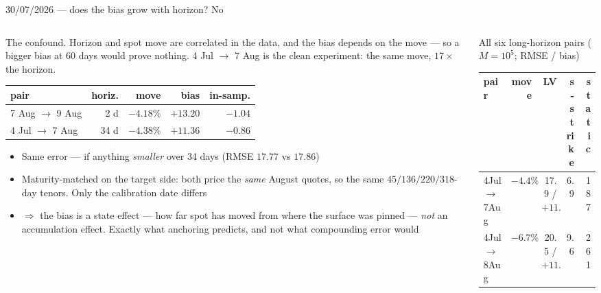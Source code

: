 \documentclass[aspectratio=169,11pt]{beamer}
\newcommand{\gold}[1]{{\color{ntugold}#1}}
\newcommand{\red}[1]{{\color{ntured}#1}}
\begin{document}
\begin{frame}[shrink=8]{30/07/2026 --- does the bias grow with horizon?  No}
  \begin{columns}[T]
    \begin{column}{0.50\linewidth}
      \gold{The confound.} Horizon and spot move are correlated in the data, and the bias
      depends on the move --- so a bigger bias at 60 days would prove nothing.
      \red{4 Jul $\to$ 7 Aug is the clean experiment}: the same move, $17\times$ the horizon.
      \begin{center}\scriptsize
      \begin{tabular}{lrrrr}
        \toprule
        pair & horiz. & move & bias & in-samp. \\
        \midrule
        7 Aug $\to$ 9 Aug & \red{2 d} & $-4.18\%$ & \red{$+13.20$} & $-1.04$ \\
        4 Jul $\to$ 7 Aug & \red{34 d} & $-4.38\%$ & \red{$+11.36$} & $-0.86$ \\
        \bottomrule
      \end{tabular}
      \end{center}
      \begin{itemize}\scriptsize
        \item \red{Same error} --- if anything \emph{smaller} over 34 days
              (RMSE $17.77$ vs $17.86$)
        \item Maturity-matched on the target side: both price the \emph{same} August
              quotes, so the same $45/136/220/318$-day tenors. Only the calibration date
              differs
        \item $\Rightarrow$ the bias is a \gold{state} effect --- how far spot has moved
              from where the surface was pinned --- \emph{not} an accumulation effect.
              Exactly what anchoring predicts, and not what compounding error would
      \end{itemize}
    \end{column}
    \begin{column}{0.46\linewidth}
      \gold{All six long-horizon pairs} ($M=10^5$; RMSE / bias)
      \begin{center}\scriptsize
      \begin{tabular}{lrrrr}
        \toprule
        pair & move & LV & s-strike & static \\
        \midrule
        4Jul$\to$7Aug & $-4.4\%$ & 17.9 / \red{$+11.4$} & 6.9 & 187 \\
        4Jul$\to$8Aug & $-6.7\%$ & 20.5 / $+11.8$ & 9.6 & 261 \\

\end{tabular}
\end{center}
\end{column}
\end{columns}
\end{frame}
\end{document}
